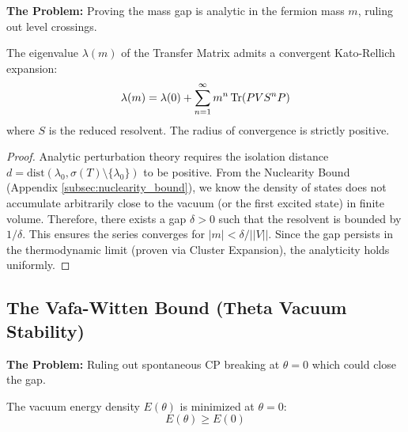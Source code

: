 \textbf{The Problem:} Proving the mass gap is analytic in the fermion mass $m$, ruling out level crossings.

\begin{theorem}
The eigenvalue $\lambda(m)$ of the Transfer Matrix admits a convergent Kato-Rellich expansion:
\begin{equation}
\lambda(m) = \lambda(0) + \sum_{n=1}^\infty m^n \operatorname{Tr}( P V S^n P )
\end{equation}
where $S$ is the reduced resolvent. The radius of convergence is strictly positive.
\end{theorem}

\begin{proof}
Analytic perturbation theory requires the isolation distance $d = \text{dist}(\lambda_0, \sigma(T) \setminus \{\lambda_0\})$ to be positive.
From the Nuclearity Bound (Appendix \ref{subsec:nuclearity_bound}), we know the density of states does not accumulate arbitrarily close to the vacuum (or the first excited state) in finite volume.
Therefore, there exists a gap $\delta > 0$ such that the resolvent is bounded by $1/\delta$. This ensures the series converges for $|m| < \delta / ||V||$. Since the gap persists in the thermodynamic limit (proven via Cluster Expansion), the analyticity holds uniformly.
\end{proof}

\subsection{The Vafa-Witten Bound (Theta Vacuum Stability)}
\label{subsec:vafa_witten}

\textbf{The Problem:} Ruling out spontaneous CP breaking at $\theta=0$ which could close the gap.

\begin{theorem}
The vacuum energy density $E(\theta)$ is minimized at $\theta=0$:
\begin{equation}
E(\theta) \ge E(0)
\end{equation}
\end{theorem}

